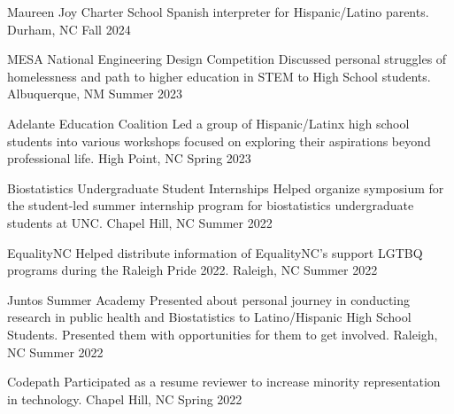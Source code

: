 \begin{cvhonors}

  \cvhonor
    {Maureen Joy Charter School} %
    {Spanish interpreter for Hispanic/Latino parents.} %
    {Durham, NC} %
    {Fall 2024} %

      \cvhonor
    {MESA National Engineering Design Competition} %
    {Discussed personal struggles of homelessness and path to higher education in STEM to High School students.} %
    {Albuquerque, NM} %
    {Summer 2023} %
    
  \cvhonor
    {Adelante Education Coalition} %
    {Led a group of Hispanic/Latinx high school students into various workshops focused on exploring their aspirations beyond professional life.} %
    {High Point, NC} %
    {Spring 2023} %
  
  \cvhonor
    {Biostatistics Undergraduate Student Internships} %
    {Helped organize symposium for the student-led summer internship program for biostatistics undergraduate students at UNC.} %
    {Chapel Hill, NC} %
    {Summer 2022} %


  \cvhonor
    {EqualityNC} %
    {Helped distribute information of EqualityNC's support LGTBQ programs during the Raleigh Pride 2022.} %
    {Raleigh, NC} %
    {Summer 2022} %

  \cvhonor
    {Juntos Summer Academy} %
    {Presented about personal journey in conducting research in public health and Biostatistics to Latino/Hispanic High School Students. Presented them with opportunities for them to get involved.} %
    {Raleigh, NC} %
    {Summer 2022} %
    
  \cvhonor
    {Codepath} %
    {Participated as a resume reviewer to increase minority representation in technology.} %
    {Chapel Hill, NC} %
    {Spring 2022} %

  
  

\end{cvhonors}




